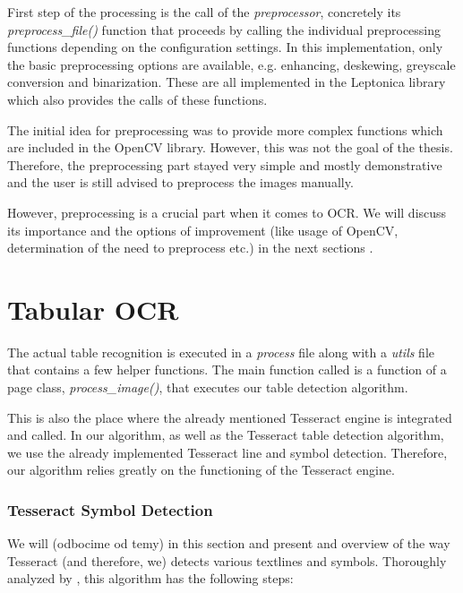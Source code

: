 First step of the processing is the call of the \emph{preprocessor}, concretely its \emph{preprocess\_file()} function that proceeds by calling the individual preprocessing functions depending on the configuration settings. In this implementation, only the basic preprocessing options are available, e.g. enhancing, deskewing, greyscale conversion and binarization. These are all implemented in the Leptonica library which also provides the calls of these functions. 

The initial idea for preprocessing was to provide more complex functions which are included in the OpenCV library. However, this was not the goal of the thesis. Therefore, the preprocessing part stayed very simple and mostly demonstrative and the user is still advised to preprocess the images manually.

However, preprocessing is a crucial part when it comes to OCR. We will discuss its importance and the options of improvement (like usage of OpenCV, determination of the need to preprocess etc.) in the next sections . 

\section{Tabular OCR}

The actual table recognition is executed in a \emph{process} file along with a \emph{utils} file that contains a few helper functions. The main function called is a function of a page class, \emph{process\_image()}, that executes our table detection algorithm.

This is also the place where the already mentioned Tesseract engine is integrated and called. In our algorithm, as well as the Tesseract table detection algorithm, we use the already implemented Tesseract line and symbol detection. Therefore, our algorithm relies greatly on the functioning of the Tesseract engine. 

\subsubsection{Tesseract Symbol Detection}

We will (odbocime od temy) in this section and present and overview of the way Tesseract (and therefore, we) detects various textlines and symbols. Thoroughly analyzed by \citet{smith2007overview}, this algorithm has the following steps:

